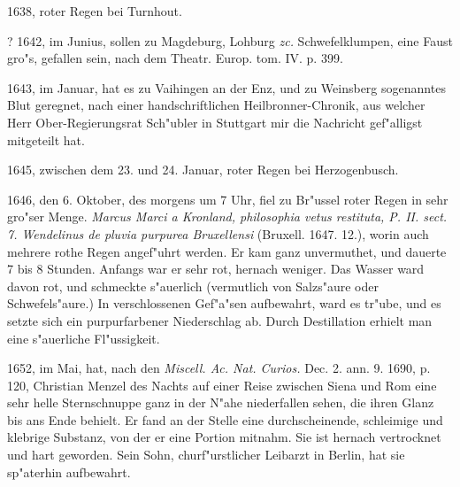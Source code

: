 \documentclass[a4paper, 11pt, oneside, polutonikogreek, german]{article}
\begin{document}
1638, roter Regen bei Turnhout.

? 1642, im Junius, sollen zu Magdeburg, Lohburg \emph{zc.} Schwefelklumpen, eine Faust gro"s, gefallen sein, nach dem Theatr. Europ. tom. IV. p. 399.

1643, im Januar, hat es zu Vaihingen an der Enz, und zu Weinsberg sogenanntes Blut geregnet, nach einer handschriftlichen Heilbronner-Chronik, aus welcher Herr Ober-Regierungsrat Sch"ubler in Stuttgart mir die Nachricht gef"alligst mitgeteilt hat.

1645, zwischen dem 23. und 24. Januar, roter Regen bei Herzogenbusch.

1646, den 6. Oktober, des morgens um 7 Uhr, fiel zu Br"ussel roter Regen in sehr gro"ser Menge. \emph{Marcus Marci a Kronland, philosophia vetus restituta, P. II. sect. 7. Wendelinus de pluvia purpurea Bruxellensi} (Bruxell. 1647. 12.), worin auch mehrere rothe Regen angef"uhrt werden. Er kam ganz unvermuthet, und dauerte 7 bis 8 Stunden. Anfangs war er sehr rot, hernach weniger. Das Wasser ward davon rot, und schmeckte s"auerlich (vermutlich von Salzs"aure oder Schwefels"aure.) In verschlossenen Gef"a"sen aufbewahrt, ward es tr"ube, und es setzte sich ein purpurfarbener Niederschlag ab. Durch Destillation erhielt man eine s"auerliche Fl"ussigkeit.

1652, im Mai, hat, nach den \emph{Miscell. Ac. Nat. Curios.} Dec. 2. ann. 9. 1690, p. 120, Christian Menzel des Nachts auf einer Reise zwischen Siena und Rom eine sehr helle Sternschnuppe ganz in der N"ahe niederfallen sehen, die ihren Glanz bis ans Ende behielt. Er fand an der Stelle eine durchscheinende, schleimige und klebrige Substanz, von der er eine Portion mitnahm. Sie ist hernach vertrocknet und hart geworden. Sein Sohn, churf"urstlicher Leibarzt in Berlin, hat sie sp"aterhin aufbewahrt.
\end{document}
